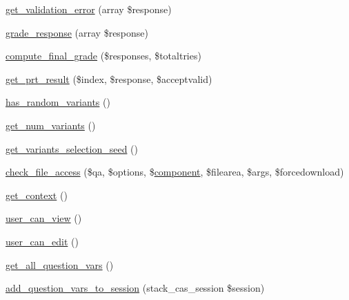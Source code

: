 \begin{DoxyCompactItemize}
\item 
\hyperlink{classqtype__stack__question_aa96049e70ad133602506d6a1d2654a10}{get\_\-validation\_\-error} (array \$response)
\item 
\hyperlink{classqtype__stack__question_ab5cfd8bc4a6eb7b94f257c1ddc50ad6a}{grade\_\-response} (array \$response)
\item 
\hyperlink{classqtype__stack__question_ad579afb9519f953ba588d12472e351bd}{compute\_\-final\_\-grade} (\$responses, \$totaltries)
\item 
\hyperlink{classqtype__stack__question_a2b51301e407f2ca52ae85778496cf43e}{get\_\-prt\_\-result} (\$index, \$response, \$acceptvalid)
\item 
\hyperlink{classqtype__stack__question_adf9e97e19bbc5ccd7785352469898538}{has\_\-random\_\-variants} ()
\item 
\hyperlink{classqtype__stack__question_a4fa4675e759d7d72e9781e462ac6663d}{get\_\-num\_\-variants} ()
\item 
\hyperlink{classqtype__stack__question_a126164aa2828ef593b96a4cc650e64b8}{get\_\-variants\_\-selection\_\-seed} ()
\item 
\hyperlink{classqtype__stack__question_a5e40ef30933689b56c1d4a0f00f9190f}{check\_\-file\_\-access} (\$qa, \$options, \$\hyperlink{version_8php_a27dc7e2c13f48a05e56e0d3138fe3c82}{component}, \$filearea, \$args, \$forcedownload)
\item 
\hyperlink{classqtype__stack__question_a6d3e2e228c2b6af0f5db437f0ea1fbda}{get\_\-context} ()
\item 
\hyperlink{classqtype__stack__question_a5440ac82608c7f9cb7e1a9490964b636}{user\_\-can\_\-view} ()
\item 
\hyperlink{classqtype__stack__question_ab652d314f92aac506494bc3bd7373f0c}{user\_\-can\_\-edit} ()
\item 
\hyperlink{classqtype__stack__question_abd4b304221b1aa33c536430efc995301}{get\_\-all\_\-question\_\-vars} ()
\item 
\hyperlink{classqtype__stack__question_a8b2f9ac27e9fe1d84abbef0487b4f755}{add\_\-question\_\-vars\_\-to\_\-session} (stack\_\-cas\_\-session \$session)
\end{DoxyCompactItemize}
